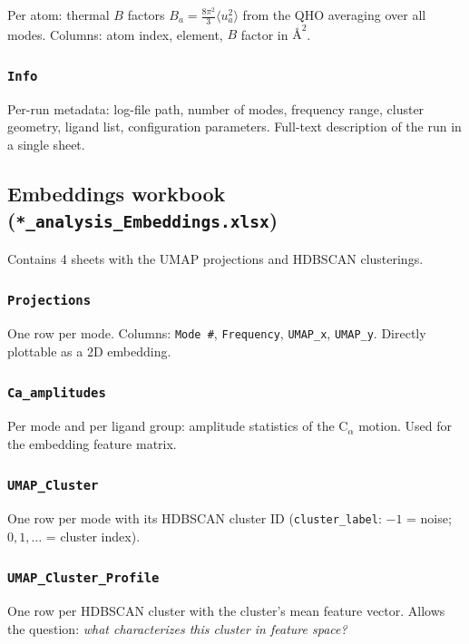 \documentclass[11pt,a4paper,twoside]{article}
\providecommand{\angstrom}{\text{\AA}}    %
\theoremstyle{remark}
\begin{document}
Per atom: thermal $B$ factors $B_a = \frac{8\pi^2}{3} \langle u_a^2
\rangle$ from the QHO averaging over all modes. Columns: atom
index, element, $B$ factor in $\angstrom^2$.

\subsubsection*{\texttt{Info}}

Per-run metadata: log-file path, number of modes, frequency
range, cluster geometry, ligand list, configuration parameters.
Full-text description of the run in a single sheet.

\subsection{Embeddings workbook (\texttt{*\_analysis\_Embeddings.xlsx})}
\label{app:wb-embeddings}

Contains 4 sheets with the UMAP projections and HDBSCAN
clusterings.

\subsubsection*{\texttt{Projections}}

One row per mode. Columns: \texttt{Mode \#}, \texttt{Frequency},
\texttt{UMAP\_x}, \texttt{UMAP\_y}. Directly plottable as a 2D
embedding.

\subsubsection*{\texttt{Ca\_amplitudes}}

Per mode and per ligand group: amplitude statistics of the
C$_\alpha$ motion. Used for the embedding feature matrix.

\subsubsection*{\texttt{UMAP\_Cluster}}

One row per mode with its HDBSCAN cluster ID
(\texttt{cluster\_label}: $-1$ = noise; $0, 1, \ldots$ = cluster
index).

\subsubsection*{\texttt{UMAP\_Cluster\_Profile}}

One row per HDBSCAN cluster with the cluster's mean feature
vector. Allows the question: \emph{what characterizes this
cluster in feature space?}
\end{document}
